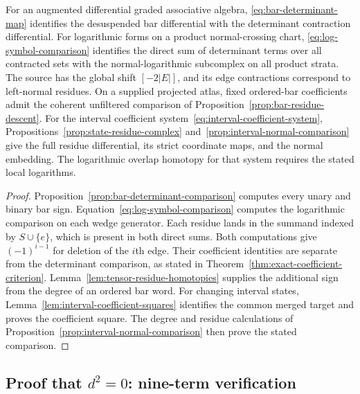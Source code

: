 \begin{lemma}
\label{lem:sign-compatibility}
For an augmented differential graded associative algebra,
\eqref{eq:bar-determinant-map} identifies the desuspended bar differential
with the determinant contraction differential.
For logarithmic forms on a product normal-crossing chart,
\eqref{eq:log-symbol-comparison} identifies the direct sum of determinant terms over all contracted sets
with the normal-logarithmic subcomplex on all product strata.
The source has the global shift $[-2|E|]$, and its edge contractions correspond to left-normal residues.
On a supplied projected atlas, fixed ordered-bar coefficients admit the coherent unfiltered comparison of
Proposition~\ref{prop:bar-residue-descent}.
For the interval coefficient system~\eqref{eq:interval-coefficient-system},
Propositions~\ref{prop:state-residue-complex} and~\ref{prop:interval-normal-comparison}
give the full residue differential, its strict coordinate maps, and the normal embedding.
The logarithmic overlap homotopy for that system requires the stated local logarithms.
\end{lemma}

\begin{proof}
Proposition~\ref{prop:bar-determinant-comparison} computes every unary and binary bar sign.
Equation~\eqref{eq:log-symbol-comparison} computes the logarithmic comparison on each wedge generator.
Each residue lands in the summand indexed by $S\cup\{e\}$, which is present in both direct sums.
Both computations give $(-1)^{i-1}$ for deletion of the $i$th edge.
Their coefficient identities are separate from the determinant comparison,
as stated in Theorem~\ref{thm:exact-coefficient-criterion}.
Lemma~\ref{lem:tensor-residue-homotopies} supplies the additional sign from the degree of an ordered bar word.
For changing interval states, Lemma~\ref{lem:interval-coefficient-squares} identifies the common merged target and proves the coefficient square.
The degree and residue calculations of Proposition~\ref{prop:interval-normal-comparison} then prove the stated comparison.
\end{proof}

\subsection{\texorpdfstring{Proof that $d^2 = 0$: nine-term verification}{Proof that d2 = 0: nine-term verification}}\label{sec:bar-nilpotency-nine-terms-complete}\label{sec:bar-nilpotency}

